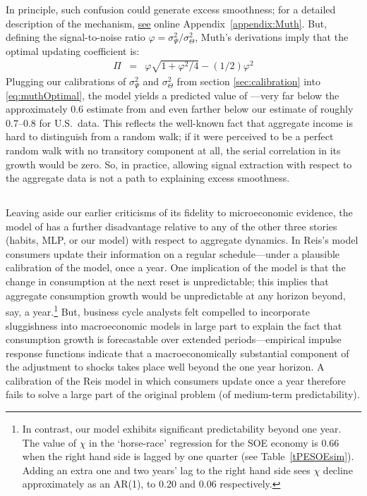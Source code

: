\documentclass[titlepage]{./econtex}
\begin{document}
In principle, such confusion could generate excess smoothness; for a detailed description of the mechanism, \hyperlink{MuthLucasPischke}{see} online Appendix~\ref{appendix:Muth}.  But, defining the signal-to-noise ratio $\varphi=\sigma^2_{\Psi}/\sigma^2_{\Theta}$, Muth's derivations imply that the optimal updating coefficient is:
  \begin{eqnarray}
\Pi & = & \varphi \sqrt{1+\varphi^{2}/4} - (1/2) \varphi^{2} \label{eq:muthOptimal}
  \end{eqnarray}
Plugging our calibrations of $\sigma^2_{\Psi}$ and $\sigma^2_{\Theta}$ from section \ref{sec:calibration} into \eqref{eq:muthOptimal}, the model yields a predicted value of ---very far below the approximately $0.6$ estimate from \cite{hrsHabit} and even farther below our estimate of roughly $0.7$--$0.8$ for U.S.\ data.  This reflects the well-known fact that aggregate income is hard to distinguish from a random walk; if it were perceived to be a perfect random walk with no transitory component at all, the serial correlation in its growth would be zero.  So, in practice, allowing signal extraction with respect to the aggregate data is not a path to explaining excess smoothness.

\subsection{\cite{reis:inattentive}}

Leaving aside our earlier criticisms of its fidelity to microeconomic evidence, the model of \cite{reis:inattentive} has a further disadvantage relative to any of the other three stories (habits, MLP, or our model) with respect to aggregate dynamics. In Reis's model consumers update their information on a regular schedule---under a plausible calibration of the model, once a year. One implication of the model is that the change in consumption at the next reset is unpredictable; this implies that aggregate consumption growth would be unpredictable at any horizon beyond, say, a year.\footnote{In contrast, our model exhibits significant predictability beyond one year. The value of $\chi$ in the `horse-race' regression for the SOE economy is 0.66 when the right hand side is lagged by one quarter (see Table~\ref{tPESOEsim}). Adding an extra one and two years' lag to the right hand side sees $\chi$ decline approximately as an AR(1), to 0.20 and 0.06 respectively.}  But, business cycle analysts felt compelled to incorporate sluggishness into macroeconomic models in large part to explain the fact that consumption growth is forecastable over extended periods---empirical impulse response functions indicate that a macroeconomically substantial component of the adjustment to shocks takes place well beyond the one year horizon.  A calibration of the Reis model in which consumers update once a year therefore fails to solve a large part of the original problem (of medium-term predictability).
\end{document}
